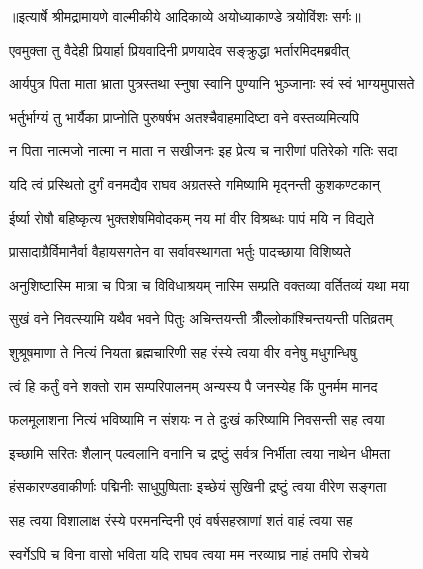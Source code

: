 {॥इत्यार्षे श्रीमद्रामायणे वाल्मीकीये आदिकाव्ये अयोध्याकाण्डे त्रयोविंशः सर्गः॥}


\twolineshloka
{एवमुक्ता तु वैदेही प्रियार्हा प्रियवादिनी}
{प्रणयादेव सङ्क्रुद्धा भर्तारमिदमब्रवीत्} %

\twolineshloka
{आर्यपुत्र पिता माता भ्राता पुत्रस्तथा स्नुषा}
{स्वानि पुण्यानि भुञ्जानाः स्वं स्वं भाग्यमुपासते} %

\twolineshloka
{भर्तुर्भाग्यं तु भार्यैका प्राप्नोति पुरुषर्षभ}
{अतश्चैवाहमादिष्टा वने वस्तव्यमित्यपि} %

\twolineshloka
{न पिता नात्मजो नात्मा न माता न सखीजनः}
{इह प्रेत्य च नारीणां पतिरेको गतिः सदा} %

\twolineshloka
{यदि त्वं प्रस्थितो दुर्गं वनमद्यैव राघव}
{अग्रतस्ते गमिष्यामि मृद्नन्ती कुशकण्टकान्} %

\twolineshloka
{ईर्ष्या रोषौ बहिष्कृत्य भुक्तशेषमिवोदकम्}
{नय मां वीर विश्रब्धः पापं मयि न विद्यते} %

\twolineshloka
{प्रासादाग्रैर्विमानैर्वा वैहायसगतेन वा}
{सर्वावस्थागता भर्तुः पादच्छाया विशिष्यते} %

\twolineshloka
{अनुशिष्टास्मि मात्रा च पित्रा च विविधाश्रयम्}
{नास्मि सम्प्रति वक्तव्या वर्तितव्यं यथा मया} %

\twolineshloka
{सुखं वने निवत्स्यामि यथैव भवने पितुः}
{अचिन्तयन्ती त्रीँल्लोकांश्चिन्तयन्ती पतिव्रतम्} %

\twolineshloka
{शुश्रूषमाणा ते नित्यं नियता ब्रह्मचारिणी}
{सह रंस्ये त्वया वीर वनेषु मधुगन्धिषु} %

\twolineshloka
{त्वं हि कर्तुं वने शक्तो राम सम्परिपालनम्}
{अन्यस्य पै जनस्येह किं पुनर्मम मानद} %

\twolineshloka
{फलमूलाशना नित्यं भविष्यामि न संशयः}
{न ते दुःखं करिष्यामि निवसन्ती सह त्वया} %

\twolineshloka
{इच्छामि सरितः शैलान् पल्वलानि वनानि च}
{द्रष्टुं सर्वत्र निर्भीता त्वया नाथेन धीमता} %

\twolineshloka
{हंसकारण्डवाकीर्णाः पद्मिनीः साधुपुष्पिताः}
{इच्छेयं सुखिनी द्रष्टुं त्वया वीरेण सङ्गता} %

\twolineshloka
{सह त्वया विशालाक्ष रंस्ये परमनन्दिनी}
{एवं वर्षसहस्राणां शतं वाहं त्वया सह} %

\twolineshloka
{स्वर्गेऽपि च विना वासो भविता यदि राघव}
{त्वया मम नरव्याघ्र नाहं तमपि रोचये} %

